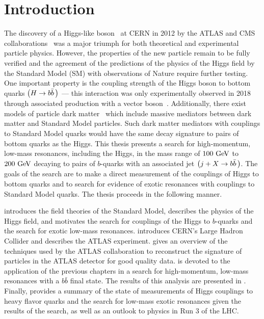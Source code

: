 \chapter{Introduction}\label{chapter:introduction}

The discovery of a Higgs-like boson~\cite{Higgs:1964ia,Higgs:1964pj,Higgs:1966ev,Englert:1964et,Guralnik:1964eu} at CERN in 2012 by the \Gls{ATLAS} and CMS collaborations~\cite{Aad:2012tfa,Chatrchyan:2012xdj} was a major triumph for both theoretical and experimental particle physics.
However, the properties of the new particle remain to be fully verified and the agreement of the predictions of the physics of the Higgs field by the \Gls{Standard Model} (SM) with observations of Nature require further testing.
One important property is the coupling strength of the Higgs boson to bottom quarks $\left(H \to b\bar{b}\,\right)$ --- this interaction was only experimentally observed in 2018 through associated production with a vector boson~\cite{Aaboud:2018zhk,CMS:2018abb}.
Additionally, there exist models of particle dark matter~\cite{Abdallah:2015ter} which include massive mediators between dark matter and Standard Model particles.
Such \glspl{dark matter mediator} with couplings to Standard Model quarks would have the same decay signature to pairs of bottom quarks as the Higgs.
This thesis presents a search for high-momentum, low-mass resonances, including the Higgs, in the mass range of $100~\mathrm{GeV}$ to $200~\mathrm{GeV}$ decaying to pairs of $b$-quarks with an associated jet $\left(j + X \to b\bar{b}\,\right)$.
The goals of the search are to make a direct measurement of the couplings of Higgs to bottom quarks and to search for evidence of exotic resonances with couplings to Standard Model quarks.
The thesis proceeds in the following manner.

 introduces the field theories of the Standard Model, describes the physics of the Higgs field, and motivates the search for couplings of the Higgs to $b$-quarks and the search for exotic low-mass resonances.
 introduces CERN's Large Hadron Collider and  describes the ATLAS experiment.
 gives an overview of the techniques used by the ATLAS collaboration to reconstruct the signature of particles in the ATLAS detector for good quality data.
 is devoted to the application of the previous chapters in a search for high-momentum, low-mass resonances with a $b\bar{b}$ final state.
The results of this analysis are presented in .
Finally,  provides a summary of the state of measurements of Higgs couplings to heavy flavor quarks and the search for low-mass exotic resonances given the results of the search, as well as an outlook to physics in Run 3 of the LHC.


